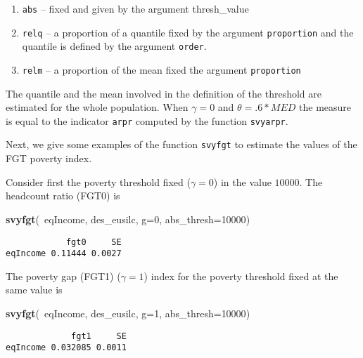 \documentclass[]{book}
\newenvironment{Shaded}{\begin{snugshade}}{\end{snugshade}}
\newcommand{\KeywordTok}[1]{\textcolor[rgb]{0.13,0.29,0.53}{\textbf{{#1}}}}
\newcommand{\DataTypeTok}[1]{\textcolor[rgb]{0.13,0.29,0.53}{{#1}}}
\newcommand{\DecValTok}[1]{\textcolor[rgb]{0.00,0.00,0.81}{{#1}}}
\newcommand{\NormalTok}[1]{{#1}}
\providecommand{\tightlist}{%
  \setlength{\itemsep}{0pt}\setlength{\parskip}{0pt}}
\begin{document}
\begin{enumerate}
\def\labelenumi{\arabic{enumi}.}
\tightlist
\item
  \texttt{abs} -- fixed and given by the argument thresh\_value
\item
  \texttt{relq} -- a proportion of a quantile fixed by the argument
  \texttt{proportion} and the quantile is defined by the argument
  \texttt{order}.
\item
  \texttt{relm} -- a proportion of the mean fixed the argument
  \texttt{proportion}
\end{enumerate}

The quantile and the mean involved in the definition of the threshold
are estimated for the whole population. When \(\gamma=0\) and
\(\theta= .6*MED\) the measure is equal to the indicator \texttt{arpr}
computed by the function \texttt{svyarpr}.

Next, we give some examples of the function \texttt{svyfgt} to estimate
the values of the FGT poverty index.

Consider first the poverty threshold fixed (\(\gamma=0\)) in the value
\(10000\). The headcount ratio (FGT0) is

\begin{Shaded}
\begin{Highlighting}[]
\KeywordTok{svyfgt}\NormalTok{(~eqIncome, des_eusilc, }\DataTypeTok{g=}\DecValTok{0}\NormalTok{, }\DataTypeTok{abs_thresh=}\DecValTok{10000}\NormalTok{)}
\end{Highlighting}
\end{Shaded}

\begin{verbatim}
            fgt0     SE
eqIncome 0.11444 0.0027
\end{verbatim}

The poverty gap (FGT1) (\(\gamma=1\)) index for the poverty threshold
fixed at the same value is

\begin{Shaded}
\begin{Highlighting}[]
\KeywordTok{svyfgt}\NormalTok{(~eqIncome, des_eusilc, }\DataTypeTok{g=}\DecValTok{1}\NormalTok{, }\DataTypeTok{abs_thresh=}\DecValTok{10000}\NormalTok{)}
\end{Highlighting}
\end{Shaded}

\begin{verbatim}
             fgt1     SE
eqIncome 0.032085 0.0011
\end{verbatim}
\end{document}
